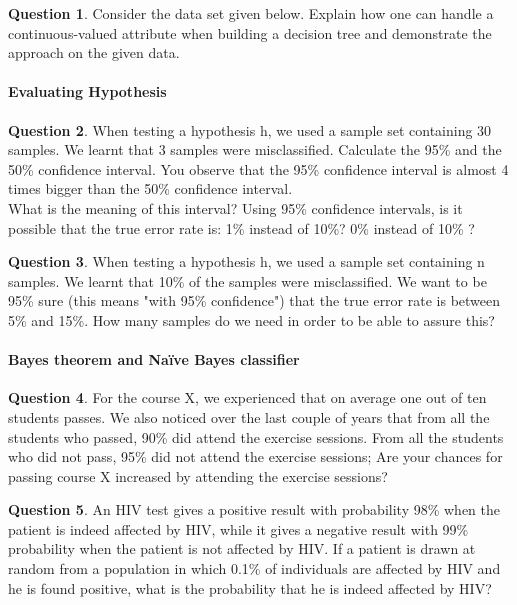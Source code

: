 \documentclass[11pt,a4paper]{article}
\theoremstyle{definition}%
\newtheorem{Q}{Question}[] %
\begin{document}
\begin{Q}
    Consider the data set given below. Explain how one can handle a continuous-valued attribute when
building a decision tree and demonstrate the approach on the given data.
\end{Q}



\paragraph{Evaluating Hypothesis}
\begin{Q}
    When testing a hypothesis h, we used a sample set containing 30 samples. We learnt that 3 samples
were misclassified. Calculate the 95\% and the 50\% confidence interval. You observe that the 95\%
confidence interval is almost 4 times bigger than the 50\% confidence interval. \\ What is the meaning
of this interval? Using 95\% confidence intervals, is it possible that the true error rate is: 
1\% instead of 10\%? 0\% instead of 10\% ?
\end{Q}

\begin{Q}
    When testing a hypothesis h, we used a sample set containing n samples. We learnt that 10\% of
the samples were misclassified. We want to be 95\% sure (this means "with 95\% confidence") that
the true error rate is between 5\% and 15\%. How many samples do we need in order to be able to
assure this?

\end{Q}

\paragraph{Bayes theorem and Na\"ive Bayes classifier}
\begin{Q}
For the course X, we experienced that on average one out of ten students passes. We also noticed
over the last couple of years that from all the students who passed, 90\% did attend the exercise
sessions. From all the students who did not pass, 95\% did not attend the exercise sessions;
Are your chances for passing course X increased by attending the exercise sessions?

\end{Q}

\begin{Q}
An HIV test gives a positive result with probability 98\% when the patient is indeed affected by
HIV, while it gives a negative result with 99\% probability when the patient is not affected by HIV.
If a patient is drawn at random from a population in which 0.1\% of individuals are affected by HIV
and he is found positive, what is the probability that he is indeed affected by HIV?
\end{Q}
\end{document}
